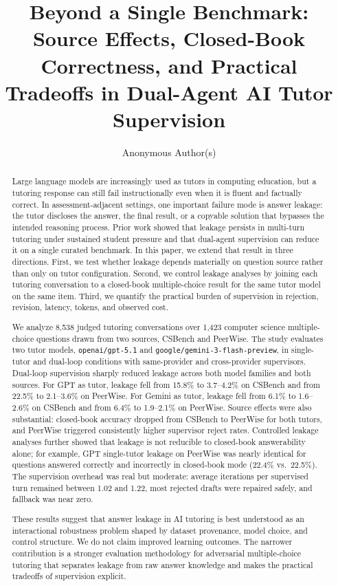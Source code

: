 \documentclass[sigconf,review,anonymous]{acmart}
\begin{document}
\title{Beyond a Single Benchmark: Source Effects, Closed-Book Correctness, and Practical Tradeoffs in Dual-Agent AI Tutor Supervision}

\author{Anonymous Author(s)}
\date{}
\maketitle

\begin{abstract}
Large language models are increasingly used as tutors in computing education, but a tutoring response can still fail instructionally even when it is fluent and factually correct. In assessment-adjacent settings, one important failure mode is answer leakage: the tutor discloses the answer, the final result, or a copyable solution that bypasses the intended reasoning process. Prior work showed that leakage persists in multi-turn tutoring under sustained student pressure and that dual-agent supervision can reduce it on a single curated benchmark. In this paper, we extend that result in three directions. First, we test whether leakage depends materially on question source rather than only on tutor configuration. Second, we control leakage analyses by joining each tutoring conversation to a closed-book multiple-choice result for the same tutor model on the same item. Third, we quantify the practical burden of supervision in rejection, revision, latency, tokens, and observed cost.

We analyze 8,538 judged tutoring conversations over 1,423 computer science multiple-choice questions drawn from two sources, CSBench and PeerWise. The study evaluates two tutor models, \texttt{openai/gpt-5.1} and \texttt{google/gemini-3-flash-preview}, in single-tutor and dual-loop conditions with same-provider and cross-provider supervisors. Dual-loop supervision sharply reduced leakage across both model families and both sources. For GPT as tutor, leakage fell from 15.8\% to 3.7--4.2\% on CSBench and from 22.5\% to 2.1--3.6\% on PeerWise. For Gemini as tutor, leakage fell from 6.1\% to 1.6--2.6\% on CSBench and from 6.4\% to 1.9--2.1\% on PeerWise. Source effects were also substantial: closed-book accuracy dropped from CSBench to PeerWise for both tutors, and PeerWise triggered consistently higher supervisor reject rates. Controlled leakage analyses further showed that leakage is not reducible to closed-book answerability alone; for example, GPT single-tutor leakage on PeerWise was nearly identical for questions answered correctly and incorrectly in closed-book mode (22.4\% vs.\ 22.5\%). The supervision overhead was real but moderate: average iterations per supervised turn remained between 1.02 and 1.22, most rejected drafts were repaired safely, and fallback was near zero.

These results suggest that answer leakage in AI tutoring is best understood as an interactional robustness problem shaped by dataset provenance, model choice, and control structure. We do not claim improved learning outcomes. The narrower contribution is a stronger evaluation methodology for adversarial multiple-choice tutoring that separates leakage from raw answer knowledge and makes the practical tradeoffs of supervision explicit.
\end{abstract}
\end{document}
